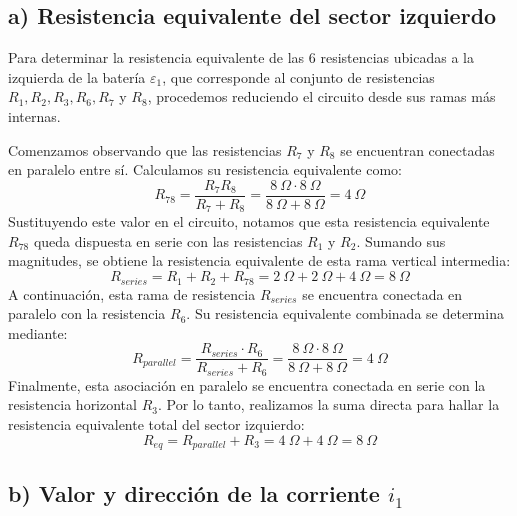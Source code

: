 \documentclass{article}
\begin{document}
\subsection*{a) Resistencia equivalente del sector izquierdo}

Para determinar la resistencia equivalente de las 6 resistencias ubicadas a la izquierda de la batería $\varepsilon_1$, que corresponde al conjunto de resistencias $R_1, R_2, R_3, R_6, R_7$ y $R_8$, procedemos reduciendo el circuito desde sus ramas más internas. 

Comenzamos observando que las resistencias $R_7$ y $R_8$ se encuentran conectadas en paralelo entre sí. Calculamos su resistencia equivalente como:
\[
R_{78} = \frac{R_7 R_8}{R_7 + R_8} = \frac{8\ \Omega \cdot 8\ \Omega}{8\ \Omega + 8\ \Omega} = 4\ \Omega
\]
Sustituyendo este valor en el circuito, notamos que esta resistencia equivalente $R_{78}$ queda dispuesta en serie con las resistencias $R_1$ y $R_2$. Sumando sus magnitudes, se obtiene la resistencia equivalente de esta rama vertical intermedia:
\[
R_{series} = R_1 + R_2 + R_{78} = 2\ \Omega + 2\ \Omega + 4\ \Omega = 8\ \Omega
\]
A continuación, esta rama de resistencia $R_{series}$ se encuentra conectada en paralelo con la resistencia $R_6$. Su resistencia equivalente combinada se determina mediante:
\[
R_{parallel} = \frac{R_{series} \cdot R_6}{R_{series} + R_6} = \frac{8\ \Omega \cdot 8\ \Omega}{8\ \Omega + 8\ \Omega} = 4\ \Omega
\]
Finalmente, esta asociación en paralelo se encuentra conectada en serie con la resistencia horizontal $R_3$. Por lo tanto, realizamos la suma directa para hallar la resistencia equivalente total del sector izquierdo:
\[
R_{eq} = R_{parallel} + R_3 = 4\ \Omega + 4\ \Omega = \boxed{8\ \Omega}
\]

\noindent{}

\subsection*{b) Valor y dirección de la corriente $i_1$}
\end{document}

